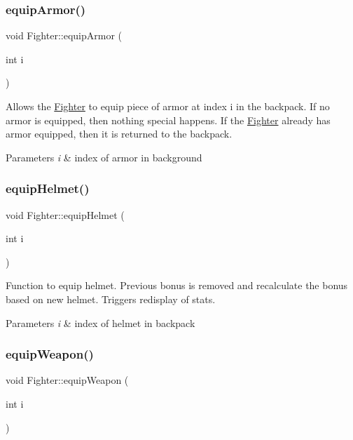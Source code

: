 \subsubsection{\texorpdfstring{equip\+Armor()}{equipArmor()}}
{\footnotesize\ttfamily void Fighter\+::equip\+Armor (\begin{DoxyParamCaption}\item[{int}]{i }\end{DoxyParamCaption})}

Allows the \hyperlink{class_fighter}{Fighter} to equip piece of armor at index \textquotesingle{}i\textquotesingle{} in the backpack. If no armor is equipped, then nothing special happens. If the \hyperlink{class_fighter}{Fighter} already has armor equipped, then it is returned to the backpack. 
\begin{DoxyParams}{Parameters}
{\em i} & index of armor in background \\
\hline
\end{DoxyParams}
\hypertarget{class_fighter_ae90d7de8a4d6b61b35f43cefe7ec940c}{}\label{class_fighter_ae90d7de8a4d6b61b35f43cefe7ec940c} 
\subsubsection{\texorpdfstring{equip\+Helmet()}{equipHelmet()}}
{\footnotesize\ttfamily void Fighter\+::equip\+Helmet (\begin{DoxyParamCaption}\item[{int}]{i }\end{DoxyParamCaption})}

Function to equip helmet. Previous bonus is removed and recalculate the bonus based on new helmet. Triggers redisplay of stats. 
\begin{DoxyParams}{Parameters}
{\em i} & index of helmet in backpack \\
\hline
\end{DoxyParams}
\hypertarget{class_fighter_a4d88916d33514e2c7e5aaaef8916f93c}{}\label{class_fighter_a4d88916d33514e2c7e5aaaef8916f93c} 
\subsubsection{\texorpdfstring{equip\+Weapon()}{equipWeapon()}}
{\footnotesize\ttfamily void Fighter\+::equip\+Weapon (\begin{DoxyParamCaption}\item[{int}]{i }\end{DoxyParamCaption})}

